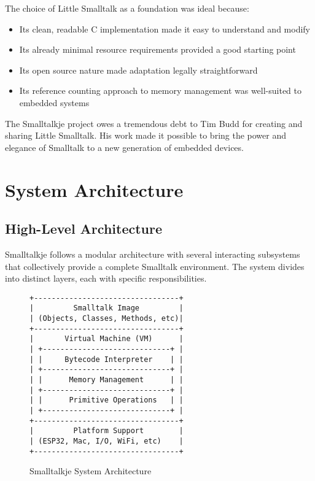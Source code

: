 \documentclass[12pt,a4paper]{report}
\begin{document}
The choice of Little Smalltalk as a foundation was ideal because:

\begin{itemize}
    \item Its clean, readable C implementation made it easy to understand and modify
    \item Its already minimal resource requirements provided a good starting point
    \item Its open source nature made adaptation legally straightforward
    \item Its reference counting approach to memory management was well-suited to embedded systems
\end{itemize}

The Smalltalkje project owes a tremendous debt to Tim Budd for creating and sharing Little Smalltalk. His work made it possible to bring the power and elegance of Smalltalk to a new generation of embedded devices.

\chapter{System Architecture}

\section{High-Level Architecture}
Smalltalkje follows a modular architecture with several interacting subsystems that collectively provide a complete Smalltalk environment. The system divides into distinct layers, each with specific responsibilities.

\begin{figure}[h]
\centering
\begin{tcolorbox}[colback=white, colframe=black, width=\textwidth, arc=0mm, boxrule=1pt]
\begin{verbatim}
+---------------------------------+
|         Smalltalk Image         |
| (Objects, Classes, Methods, etc)|
+---------------------------------+
|       Virtual Machine (VM)      |
| +-----------------------------+ |
| |     Bytecode Interpreter    | |
| +-----------------------------+ |
| |      Memory Management      | |
| +-----------------------------+ |
| |      Primitive Operations   | |
| +-----------------------------+ |
+---------------------------------+
|         Platform Support        |
| (ESP32, Mac, I/O, WiFi, etc)    |
+---------------------------------+
\end{verbatim}
\end{tcolorbox}
\caption{Smalltalkje System Architecture}
\end{figure}
\end{document}
